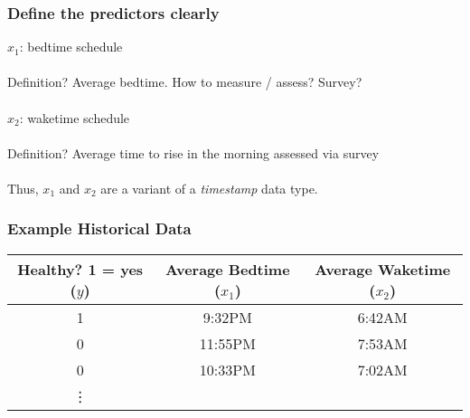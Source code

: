 \documentclass[slides]{beamer} %
\begin{document}
\begin{frame}\frametitle{Define the predictors clearly}

$x_1$: bedtime schedule \\~\\

Definition? \pause Average bedtime. \pause How to measure / assess? Survey? \\~\\	



$x_2$: waketime schedule \\~\\	

Definition? \pause Average time to rise in the morning assessed via survey\\~\\	

Thus, $x_1$ and $x_2$ are a variant of a \textit{timestamp} data type.

\end{frame}

\begin{frame}\frametitle{Example Historical Data}

\begin{table}
\centering
\begin{tabular}{ccc}
Healthy? 1 = yes ($y$) & Average Bedtime ($x_1$) & Average Waketime ($x_2$) \\ \hline
1 & 9:32PM & 6:42AM \\
0 & 11:55PM & 7:53AM \\
0 & 10:33PM & 7:02AM \\
\vdots
\end{tabular}
\end{table}

	
\end{frame}

\begin{frame}\frametitle{}

	
\end{frame}

\begin{frame}\frametitle{}

	
\end{frame}

\begin{frame}\frametitle{}

	
\end{frame}
\end{document}
